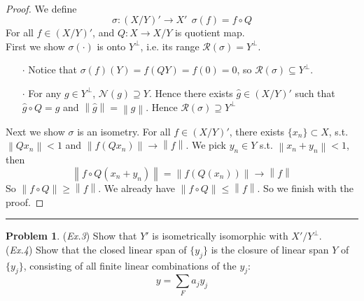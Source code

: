 \documentclass[a4paper, 10pt]{article}
\theoremstyle{definition}
\newtheorem{problem}{Problem}
\theoremstyle{hSol}
\begin{document}
~\\

\begin{proof} We define
$$\sigma: (X/Y)' \to X'~~\sigma(f)=f\circ Q$$
For all $f\in (X/Y)'$, and $Q: X\to X/Y$ is quotient map. \\
First we show $\sigma(\cdot)$ is onto $Y^{\bot}$, i.e. its range $\mathcal{R}(\sigma)=Y^{\bot}$. 
\begin{itemize}
	\item[$\cdot$] Notice that $\sigma(f)(Y) = f(QY) = f(0) = 0$, so $\mathcal{R}(\sigma)\subseteq Y^{\bot}$.
	\item[$\cdot$] For any $g\in Y^{\bot}$, $\mathcal{N}(g)\supseteq Y$. Hence there exists $\hat{g}\in (X/Y)'$ such that $\hat{g}\circ Q = g$ and $\left\|\hat{g}\right\|=\left\|g\right\|$. Hence $\mathcal{R}(\sigma)\supseteq Y^{\bot}$
\end{itemize}
Next we show $\sigma$ is an isometry. For all $f\in (X/Y)'$, there exists $\{x_n\}\subset X$, s.t. $\left\|Qx_n\right\|<1$ and $\left\|f(Qx_n)\right\| \to \left\|f\right\|$. We pick $y_n\in Y$ s.t. $\left\|x_n + y_n\right\|<1$, then
\begin{equation}
	\left\|f\circ Q(x_n+y_n)\right\| = \left\|f(Q(x_n))\right\| \to \left\|f\right\|
\end{equation}
So $\left\|f\circ Q\right\|\geq \left\|f\right\|$. We already have $\left\|f\circ Q\right\|\leq \left\|f\right\|$. So we finish with the proof.
\end{proof}

\noindent\rule{16cm}{0.4pt}
\begin{problem} (\textit{Ex.3}) Show that $Y'$ is isometrically isomorphic with $X'/Y^{\bot}$. \\
(\textit{Ex.4}) Show that the closed linear span of $\{y_j\}$ is the closure of linear span $Y$ of $\{y_j\}$, consisting of all finite linear combinations of the $y_j$:
$$
y = \sum_F a_j y_j
$$
\end{problem}
\end{document}
